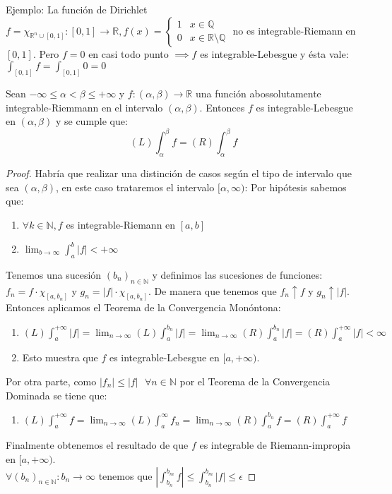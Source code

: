 \begin{observación}
    Ejemplo: La función de Dirichlet $f = \chi_{\mathbb{R}^n \cup [0,1]}: [0,1] \to \mathbb{R}, f(x) = \begin{cases} 1 & x \in \mathbb{Q} \\ 0 & x \in \mathbb{R} \setminus \mathbb{Q} \end{cases}$ no es integrable-Riemann en $[0, 1]$.
    Pero $f = 0$ en casi todo punto $\implies f$ es integrable-Lebesgue y ésta vale: $\int_{[0, 1]}f = \int_{[0, 1]}0 = 0$
\end{observación}
\begin{teorema}
    Sean $-\infty \leq \alpha < \beta \leq +\infty$ y $f: (\alpha, \beta) \to \mathbb{R}$ una función abossolutamente integrable-Riemmann en el intervalo $(\alpha, \beta)$. Entonces $f$ es integrable-Lebesgue en $(\alpha, \beta)$ y se cumple que:
    $$ (L) \int_{\alpha}^{\beta}f = (R)\int_{\alpha}^{\beta}f $$
\end{teorema}
\begin{proof}
    Habría que realizar una distinción de casos según el tipo de intervalo que sea $(\alpha, \beta)$, en este caso trataremos el intervalo $[\alpha, \infty)$: 
    Por hipótesis sabemos que: 
    \begin{enumerate}
        \item $\forall k \in \mathbb{N}, f$ es integrable-Riemann en $[a, b]$
        \item $\lim_{b \to \infty} \int_{a}^{b}|f| < +\infty$
    \end{enumerate}
    Tenemos una sucesión $(b_n)_{n \in \mathbb{N}}$ y definimos las sucesiones de funciones: $f_n = f\cdot\chi_{[a, b_n]}$ y $g_n = |f|\cdot\chi_{[a, b_n]}$.
    De manera que tenemos que $f_n \uparrow f$ y $g_n \uparrow |f|$. Entonces aplicamos el Teorema de la Convergencia Monóntona: 
    \begin{enumerate}
        \item $(L)\int_{a}^{+\infty}|f| = \lim_{n \to \infty}(L)\int_{a}^{b_n}|f| = \lim_{n \to \infty}(R)\int_{a}^{b_n}|f| = (R)\int_{a}^{+\infty}|f| < \infty$
        \item Esto muestra que $f$ es integrable-Lebesgue en $[a, +\infty)$. 
    \end{enumerate}
    Por otra parte, como $|f_n| \leq |f| \text{  }\forall n \in \mathbb{N}$ por el Teorema de la Convergencia Dominada se tiene que:
    \begin{enumerate}
        \item $(L)\int_{a}^{+\infty}f = \lim_{n \to \infty}(L)\int_{a}^{\infty}f_n = \lim_{n \to \infty}(R)\int_{a}^{b_n}f = (R)\int_{a}^{+\infty}f$
    \end{enumerate}
    Finalmente obtenemos el resultado de que $f$ es integrable de Riemann-impropia en $[a, +\infty)$.
    \\$\forall (b_n)_{n \in \mathbb{N}} : b_n \to \infty$ tenemos que $|\int_{b_n}^{b_m}f| \leq \int_{b_n}^{b_m}|f| \leq \epsilon$
\end{proof}
